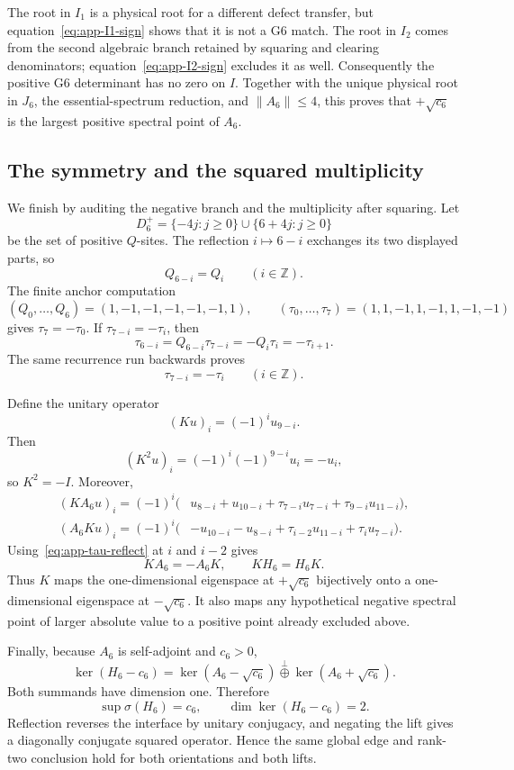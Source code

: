 The root in \(I_1\) is a physical root for a different defect transfer, but
equation~\eqref{eq:app-I1-sign} shows that it is not a G6 match.  The root in
\(I_2\) comes from the second algebraic branch retained by squaring and
clearing denominators; equation~\eqref{eq:app-I2-sign} excludes it as well.
Consequently the positive G6 determinant has no zero on \(I\).  Together
with the unique physical root in \(J_6\), the essential-spectrum reduction,
and \(\|A_6\|\leq4\), this proves that \(+\sqrt{c_6}\) is the largest
positive spectral point of \(A_6\).

\subsection{The symmetry and the squared multiplicity}
\label{appsubsec:g6-rank-two}

We finish by auditing the negative branch and the multiplicity after
squaring.  Let
\[
 D_6^{+}=\{-4j:j\geq0\}\cup\{6+4j:j\geq0\}
\]
be the set of positive \(Q\)-sites.  The reflection \(i\mapsto6-i\)
exchanges its two displayed parts, so
\begin{equation}
 Q_{6-i}=Q_i\qquad(i\in\mathbb Z).                    \label{eq:app-Q-reflect}
\end{equation}
The finite anchor computation
\[
 (Q_0,\ldots,Q_6)=(1,-1,-1,-1,-1,-1,1),\qquad
 (\tau_0,\ldots,\tau_7)=(1,1,-1,1,-1,1,-1,-1)
\]
gives \(\tau_7=-\tau_0\).  If \(\tau_{7-i}=-\tau_i\), then
\[
 \tau_{6-i}=Q_{6-i}\tau_{7-i}
 =-Q_i\tau_i=-\tau_{i+1}.
\]
The same recurrence run backwards proves
\begin{equation}
 \tau_{7-i}=-\tau_i\qquad(i\in\mathbb Z).             \label{eq:app-tau-reflect}
\end{equation}

Define the unitary operator
\[
 (Ku)_i=(-1)^iu_{9-i}.
\]
Then
\[
 (K^2u)_i=(-1)^i(-1)^{9-i}u_i=-u_i,
\]
so \(K^2=-I\).  Moreover,
\begin{align*}
(KA_6u)_i=(-1)^i\bigl(&u_{8-i}+u_{10-i}
 +\tau_{7-i}u_{7-i}+\tau_{9-i}u_{11-i}\bigr),\\
(A_6Ku)_i=(-1)^i\bigl(&-u_{10-i}-u_{8-i}
 +\tau_{i-2}u_{11-i}+\tau_i u_{7-i}\bigr).
\end{align*}
Using~\eqref{eq:app-tau-reflect} at \(i\) and \(i-2\) gives
\[
 KA_6=-A_6K,\qquad KH_6=H_6K.                         \label{eq:app-K-relations}
\]
Thus \(K\) maps the one-dimensional eigenspace at \(+\sqrt{c_6}\)
bijectively onto a one-dimensional eigenspace at \(-\sqrt{c_6}\).
It also maps any hypothetical negative spectral point of larger absolute
value to a positive point already excluded above.

Finally, because \(A_6\) is self-adjoint and \(c_6>0\),
\begin{equation}
 \ker(H_6-c_6)
 =\ker(A_6-\sqrt{c_6})
 \mathbin{\overset{\perp}{\oplus}}
 \ker(A_6+\sqrt{c_6}).                                \label{eq:app-rank-two}
\end{equation}
Both summands have dimension one.  Therefore
\[
 \sup\sigma(H_6)=c_6,\qquad
 \dim\ker(H_6-c_6)=2.
\]
Reflection reverses the interface by unitary conjugacy, and negating the
lift gives a diagonally conjugate squared operator.  Hence the same global
edge and rank-two conclusion hold for both orientations and both lifts.
